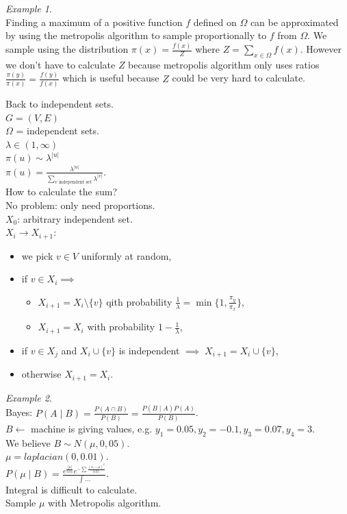 \documentclass[a4paper, 12pt]{book}
\theoremstyle{definition}
\theoremstyle{remark}
\newtheorem*{ex}{Example}
\begin{document}
\begin{ex} \text{} \\
  Finding a maximum of a positive function $f$ defined on $\Omega$ can be approximated by using the metropolis algorithm to sample proportionally 
  to $f$ from $\Omega$. We sample using the distribution $\pi(x) = \frac{f(x)}{Z}$ where $Z = \sum_{x \in \Omega}f(x)$. However
  we don't have to calculate $Z$ because metropolis algorithm only uses ratios $\frac{\pi(y)}{\pi(x)} = \frac{f(y)}{f(x)}$
  which is useful because $Z$ could be very hard to calculate.
\end{ex}



Back to independent sets. \\
$G = (V, E)$ \\
$\Omega$ = independent sets. \\
$\lambda \in (1, \infty)$ \\
$\pi(u) \sim \lambda^{|u|}$ \\
$\pi(u) = \frac{\lambda^{|u|}}{\sum_{v \text{ independent set}} \lambda^{|v|}}$. \\
How to calculate the sum? \\
No problem: only need proportions. \\
$X_0$: arbitrary independent set. \\
$X_i \to X_{i+1}$:
\begin{itemize}
  \item we pick $v \in V$ uniformly at random,
  \item if $v \in X_i \implies$
    \begin{itemize}
      \item $X_{i+1} = X_i \setminus \{v\}$ qith probability $\frac{1}{\lambda} = \min \{1, \frac{\pi_y}{\pi_x}\}$,
      \item $X_{i+1} = X_i$ with probability $1 - \frac{1}{\lambda}$,
    \end{itemize}
  \item if $v \in X_j$ and $X_i \cup \{v\}$ is independent $\implies \; X_{i+1} = X_i \cup \{v\}$,
  \item otherwise $X_{i+1} = X_i$.
\end{itemize}
\begin{ex} \text{} \\
  Bayes: $P(A \mid B) = \frac{P(A \cap B)}{P(B)} = \frac{P(B \mid A) P(A)}{P(B)}$. \\
  $B \leftarrow$ machine is giving values, e.g. $y_1 = 0.05, y_2 = -0.1, y_3 = 0.07, y_4 = 3$. \\
  We believe $B \sim N(\mu, 0,05)$. \\
  $\mu = laplacian(0, 0.01)$. \\
  $P(\mu \mid B) = \frac{e^{\frac{|\mu|}{0.01}} e^{-\sum \frac{(x_i-\mu)^2}{0.05}}}{\int \dots}$. \\
  Integral is difficult to calculate. \\
  Sample $\mu$ with Metropolis algorithm.
\end{ex}
\end{document}
